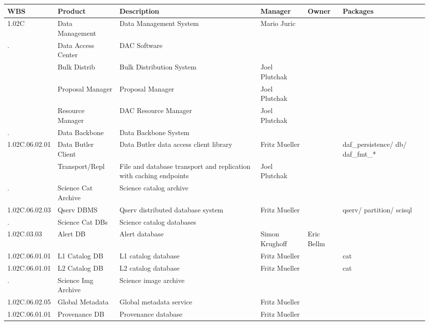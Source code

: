 

\tiny
\begin{longtable}{|p{}|p{}|p{}|p{}|p{}|p{}|}\hline
\textbf{WBS} & Product & Description & Manager & Owner & Packages\\ \hline
1.02C &  Data Management & Data Management System & Mario Juric &  & \\ \hline
. &  Data Access Center & DAC Software &  &  & \\ \hline
 &  Bulk Distrib & Bulk Distribution System & Joel Plutchak &  & \\ \hline
 &  Proposal Manager & Proposal Manager & Joel Plutchak &  & \\ \hline
 &  Resource Manager & DAC Resource Manager & Joel Plutchak &  & \\ \hline
. &  Data Backbone & Data Backbone System &  &  & \\ \hline
1.02C.06.02.01 &  Data Butler Client & Data Butler data access client library & Fritz Mueller &  & daf\_persistence/ db/ daf\_fmt\_*\\ \hline
 &  Transport/Repl & File and database transport and replication with caching endpoints & Joel Plutchak &  & \\ \hline
. &  Science Cat Archive & Science catalog archive &  &  & \\ \hline
1.02C.06.02.03 &  Qserv DBMS & Qserv distributed database system & Fritz Mueller &  & qserv/ partition/ scisql\\ \hline
. &  Science Cat DBs & Science catalog databases &  &  & \\ \hline
1.02C.03.03 &  Alert DB & Alert database & Simon Krughoff & Eric Bellm & \\ \hline
1.02C.06.01.01 &  L1 Catalog DB & L1 catalog database & Fritz Mueller &  & cat\\ \hline
1.02C.06.01.01 &  L2 Catalog DB & L2 catalog database & Fritz Mueller &  & cat\\ \hline
. &  Science Img Archive & Science image archive &  &  & \\ \hline
1.02C.06.02.05 &  Global Metadata & Global metadata service & Fritz Mueller &  & \\ \hline
1.02C.06.01.01 &  Provenance DB & Provenance database & Fritz Mueller &  & \\ \hline

\end{longtable}
